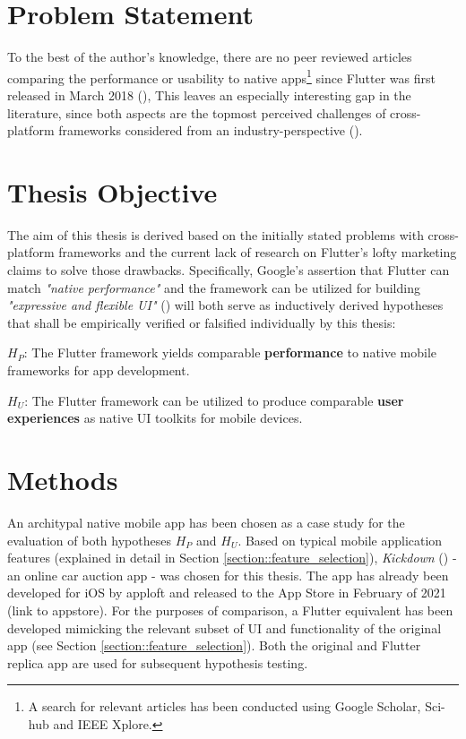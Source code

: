 \section{Problem Statement}
To the best of the author's knowledge, there are no peer reviewed articles comparing the performance or usability to native apps\footnote{A search for relevant articles has been conducted using Google Scholar, Sci-hub and IEEE Xplore.} since Flutter was first released in March 2018 (\cite{FlutterReleases2020}), 
This leaves an especially interesting gap in the literature, since both aspects are the topmost perceived challenges of cross-platform frameworks considered from an industry-perspective (\cite{BioernHansen2019}).

\section{Thesis Objective}
The aim of this thesis is derived based on the initially stated problems with cross-platform frameworks and the current lack of research on Flutter's lofty marketing claims to solve those drawbacks.
Specifically, Google's assertion that Flutter can match \textit{"native performance"} and the framework can be utilized for building \textit{"expressive and flexible UI"} (\cite{FlutterDev20})
will both serve as inductively derived hypotheses that shall be empirically verified or falsified individually by this thesis:

\textbf{$H_P$}: The Flutter framework yields comparable \textbf{performance} to native mobile frameworks for app development.

\textbf{$H_U$}: The Flutter framework can be utilized to produce comparable \textbf{user experiences} as native UI toolkits for mobile devices.

\section{Methods}
An architypal native mobile app has been chosen as a case study for the evaluation of both hypotheses $H_P$ and $H_U$.
Based on typical mobile application features (explained in detail in Section \ref{section::feature_selection}), \textit{Kickdown} (\cite{Kickdown2021}) - an online car auction app - was chosen for this thesis. 
The app has already been developed for iOS by apploft and released to the App Store in February of 2021 (link to appstore).
For the purposes of comparison, a Flutter equivalent has been developed mimicking the relevant subset of UI and functionality of the original app (see Section \ref{section::feature_selection}). 
Both the original and Flutter replica app are used for subsequent hypothesis testing.



